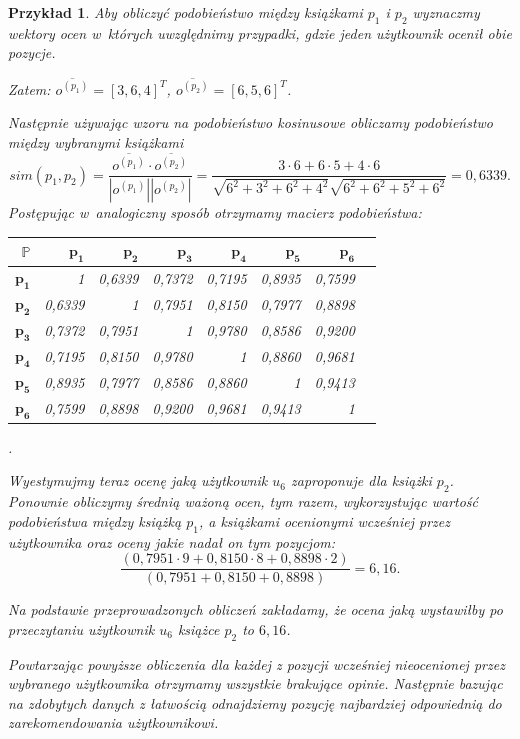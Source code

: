 \documentclass[12pt,a4paper]{report}
\newtheorem{przyklad}{Przykład}[chapter]{\normalfont}
\begin{document}
\begin{przyklad}
Aby obliczyć podobieństwo między książkami $p_1$ i $p_2$ wyznaczmy wektory ocen w~których uwzględnimy przypadki, gdzie jeden użytkownik ocenił obie pozycje.

Zatem: $\overline{o^{(p_1)}} = [3, 6, 4]^T$, $\overline{o^{(p_2)}} =[6, 5, 6]^T$.

Następnie używając wzoru na podobieństwo kosinusowe obliczamy podobieństwo między wybranymi książkami
$$
sim(p_1,p_2) = \frac{\overline{o^{(p_1)}} \cdot \overline{o^{(p_2)}}}{|o^{(p_1)}||o^{(p_2)}|} = \frac{3 \cdot 6 + 6 \cdot 5 + 4 \cdot 6}{\sqrt{6^2 + 3^2 + 6^2 + 4^2} \sqrt{6^2 + 6^2 + 5^2 + 6^2}} = 0,6339.
$$
Postępując w~analogiczny sposób otrzymamy macierz podobieństwa:
\begin{center}
\begin{tabular}{|r|r|r|r|r|r|r|r|} \hline
$\mathbb{P}$ & $\mathbf{p_1}$ & $\mathbf{p_2}$ & $\mathbf{p_3}$ & $\mathbf{p_4}$ & $\mathbf{p_5}$ & $\mathbf{p_6}$ \\
\hline
$\mathbf{p_1}$ & 1 & 0,6339 & 0,7372 & 0,7195 & 0,8935 & 0,7599 \\
\hline
$\mathbf{p_2}$ & 0,6339 & 1 & 0,7951 & 0,8150 & 0,7977 & 0,8898 \\
\hline
$\mathbf{p_3}$ & 0,7372 & 0,7951 & 1 & 0,9780 & 0,8586 & 0,9200 \\
\hline
$\mathbf{p_4}$ & 0,7195 & 0,8150 & 0,9780 & 1 & 0,8860 & 0,9681 \\
\hline 
$\mathbf{p_5}$ & 0,8935 & 0,7977 & 0,8586 & 0,8860 & 1 & 0,9413 \\
\hline 
$\mathbf{p_6}$ & 0,7599 & 0,8898 & 0,9200 & 0,9681 & 0,9413 & 1 \\
\hline 
\end{tabular}.
\end{center}
Wyestymujmy teraz ocenę jaką użytkownik $u_6$ zaproponuje dla książki $p_2$. Ponownie obliczymy średnią ważoną ocen, tym razem, wykorzystując wartość podobieństwa między książką $p_1$, a książkami ocenionymi wcześniej przez użytkownika oraz oceny jakie nadał on tym pozycjom:
$$
\frac{(0,7951 \cdot 9 + 0,8150 \cdot 8 + 0,8898 \cdot 2)}{(0,7951 + 0,8150 + 0,8898)} = 6,16.
$$

Na podstawie przeprowadzonych obliczeń zakładamy, że ocena jaką wystawiłby po przeczytaniu użytkownik $u_6$ książce $p_2$ to $6,16$.

Powtarzając powyższe obliczenia dla każdej z pozycji wcześniej nieocenionej przez wybranego użytkownika otrzymamy wszystkie brakujące opinie. Następnie bazując na zdobytych danych z łatwością odnajdziemy pozycję najbardziej odpowiednią do zarekomendowania użytkownikowi.
\end{przyklad}
\end{document}
